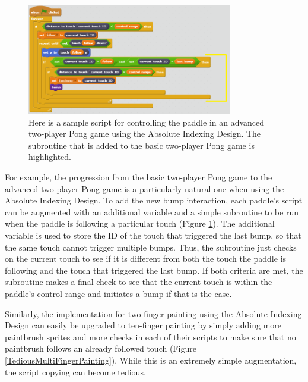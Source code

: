 \begin{figure}
\centering
\includegraphics[width=0.8\textwidth]{images/AdvancedTwoPlayerPongAID.PNG}
\caption[Sample Absolute Indexing Design Script for Advanced Two-Player Pong]{Here is a sample script for controlling the paddle in an advanced two-player Pong game using the Absolute Indexing Design. The subroutine that is added to the basic two-player Pong game is highlighted. }
\label{AdvancedTwoPlayerPongAID}
\end{figure}

For example, the progression from the basic two-player Pong game to the advanced two-player Pong game is a particularly natural one when using the Absolute Indexing Design. To add the new bump interaction, each paddle's script can be augmented with an additional variable and a simple subroutine to be run when the paddle is following a particular touch (Figure \ref{AdvancedTwoPlayerPongAID}). The additional variable is used to store the ID of the touch that triggered the last bump, so that the same touch cannot trigger multiple bumps. Thus, the subroutine just checks on the current touch to see if it is different from both the touch the paddle is following and the touch that triggered the last bump. If both criteria are met, the subroutine makes a final check to see that the current touch is within the paddle's control range and initiates a bump if that is the case.

Similarly, the implementation for two-finger painting using the Absolute Indexing Design can easily be upgraded to ten-finger painting by simply adding more paintbrush sprites and more checks in each of their scripts to make sure that no paintbrush follows an already followed touch (Figure \ref{TediousMultiFingerPainting}). While this is an extremely simple augmentation, the script copying can become tedious. 

